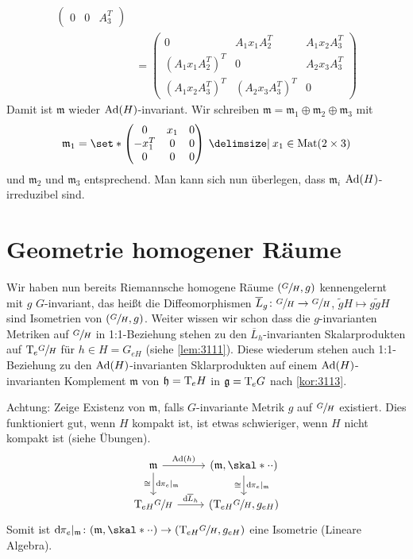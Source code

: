 \begin{beispiel*}[{name=[Beispiel für nicht irreduzible Isotropiedarstellung]}]
\begin{align}
\begin{pmatrix}
			0 & 0 & A_3^T
		\end{pmatrix}\\
		&= 
		\begin{pmatrix}
			0 & A_1 x_1 A_2^T & A_1 x_2 A_3^T \\
			(A_1 x_1 A_2^T)^T & 0 & A_2 x_3 A_3^T \\
			(A_1 x_2 A_3^T)^T & (A_2 x_3 A_3^T)^T & 0
		\end{pmatrix}
	\end{align}
	Damit ist $\mathfrak{m}$ wieder $\operatorname{Ad}(H)$-invariant.
	Wir schreiben $\mathfrak{m} = \mathfrak{m}_1 \oplus \mathfrak{m}_2 \oplus \mathfrak{m}_3$ mit 
	\[
		\mathfrak{m}_1 = \set*{\begin{pmatrix}
			0 & x_1 & 0\\
			-x_1^T & 0 & 0 \\
			0 & 0 & 0
		\end{pmatrix} \given x_1 \in \Mat(2 \times 3)}
	\]
	und $\mathfrak{m}_2$ und $\mathfrak{m}_3$ entsprechend.
	Man kann sich nun überlegen, dass $\mathfrak{m}_i$ $\operatorname{Ad}(H)$-irreduzibel sind.
\end{beispiel*}

\section{Geometrie homogener Räume} %
\label{sec:32}

Wir haben nun bereits Riemannsche homogene Räume $(\sfrac{G}{H},g)$ kennengelernt mit $g$ $G$-invariant, das heißt die Diffeomorphismen $\overline{L}_g \colon \sfrac{G}{H} \to \sfrac{G}{H}$, $\tilde{g} H \mapsto g \tilde{g} H$ sind Isometrien von $(\sfrac{G}{H},g)$.
Weiter wissen wir schon dass die $g$-invarianten Metriken auf $\sfrac{G}{H}$ in 1:1-Beziehung stehen zu den $\overline{L}_h$-invarianten Skalarprodukten auf $\mathrm{T}\mkern-0.85mu_e \sfrac{G}{H}$ für $h \in H = G_{eH}$ (siehe \autoref{lem:3111}).
Diese wiederum stehen auch 1:1-Beziehung zu den $\operatorname{Ad}(H)$-invarianten Sklarprodukten auf einem $\operatorname{Ad}(H)$-invarianten Komplement $\mathfrak{m}$ von $\mathfrak{h} = \mathrm{T}\mkern-0.85mu_eH$ in $\mathfrak{g} = \mathrm{T}\mkern-0.85mu_eG$ nach \autoref{kor:3113}.

Achtung: Zeige Existenz von $\mathfrak{m}$, falls $G$-invariante Metrik $g$ auf $\sfrac{G}{H}$ existiert.
Dies funktioniert gut, wenn $H$ kompakt ist, ist etwas schwieriger, wenn $H$ nicht kompakt ist (siehe Übungen).
\[
	\begin{tikzcd}
		\mathfrak{m} \rar["\Ad(h)"] \dar["\mathd \pi_e|_\mathfrak{m}","\cong"'] & \enbrace*{\mathfrak{m},\skal*{\cdot}{\cdot}} \dar["\mathd \pi_e|_\mathfrak{m}","\cong"'] \\
		\Tmap_{eH} \sfrac{G}{H} \rar["\mathd \overline{L}_h"] & \enbrace*{\Tmap_{eH} \sfrac{G}{H}, g_{eH}}
	\end{tikzcd}
\]
Somit ist $\mathd \pi_e|_\mathfrak{m} \colon \enbrace*{\mathfrak{m}, \skal*{\cdot }{\cdot }} \to \enbrace*{\Tmap_{eH} \sfrac{G}{H}, g_{eH}}$ eine Isometrie (Lineare Algebra).

